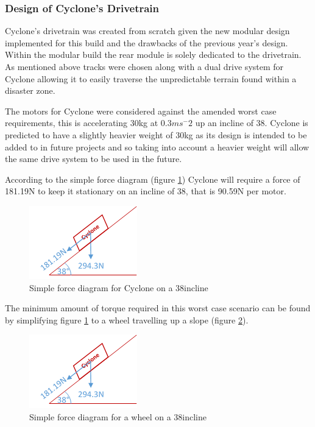 \subsubsection{Design of Cyclone's Drivetrain}

Cyclone’s drivetrain was created from scratch given the new modular design implemented for this build and the drawbacks of the previous year’s design. Within the modular build the rear module is solely dedicated to the drivetrain. As mentioned above tracks were chosen along with a dual drive system for Cyclone allowing it to easily traverse the unpredictable terrain found within a disaster zone.\par

The motors for Cyclone were considered against the amended worst case requirements, this is accelerating 30kg at 0.3$ms^-2$ up an incline of 38\textordmasculine. Cyclone is predicted to have a slightly heavier weight of 30kg as its design is intended to be added to in future projects and so taking into account a heavier weight will allow the same drive system to be used in the future.\par

According to the simple force diagram (figure \ref{fig:simpleforcecyclone}) Cyclone will require a force of 181.19N to keep it stationary on an incline of 38\textordmasculine, that is 90.59N per motor.\par

\begin{figure}[h]
\centering\includegraphics[width=0.4\linewidth]{Images/DT_Fig_15.png}
\caption{Simple force diagram for Cyclone on a 38\textordmasculine incline}
\label{fig:simpleforcecyclone}
\end{figure}

The minimum amount of torque required in this worst case scenario can be found by simplifying figure \ref{fig:simpleforcecyclone} to a wheel travelling up a slope (figure \ref{fig:simpleforcewheel}).

\begin{figure}[h]
\centering\includegraphics[width=0.4\linewidth]{Images/DT_Fig_16.png}
\caption{Simple force diagram for a wheel on a 38\textordmasculine incline}
\label{fig:simpleforcewheel}
\end{figure}

